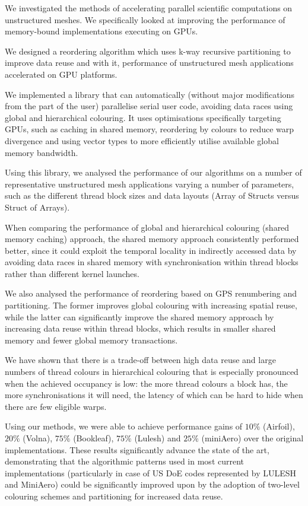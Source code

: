 We investigated the methods of accelerating parallel scientific computations on
unstructured meshes. We specifically looked at improving the performance of
memory-bound implementations executing on GPUs.

We designed a reordering algorithm which uses k-way recursive partitioning to
improve data reuse and with it, performance of unstructured mesh applications
accelerated on GPU platforms.

We implemented a library that can automatically (without major modifications
from the part of the user) parallelise serial user code, avoiding data races
using global and hierarchical colouring. It uses optimisations specifically
targeting GPUs, such as caching in shared memory, reordering by colours to
reduce warp divergence and using vector types to more efficiently utilise
available global memory bandwidth.

Using this library, we analysed the performance of our algorithms on a number of
representative unstructured mesh applications varying a number of parameters,
such as the different thread block sizes and data layouts (Array of Structs
versus Struct of Arrays).

When comparing the performance of global and hierarchical colouring (shared
memory caching) approach, the shared memory approach consistently performed
better, since it could exploit the temporal locality in indirectly accessed data
by avoiding data races in shared memory with synchronisation within thread
blocks rather than different kernel launches.

We also analysed the performance of reordering based on GPS renumbering and
partitioning. The former improves global colouring with increasing spatial
reuse, while the latter can significantly improve the shared memory approach by
increasing data reuse within thread blocks, which results in smaller shared
memory and fewer global memory transactions.

We have shown that there is a trade-off between high data reuse and large
numbers of thread colours in hierarchical colouring that is especially
pronounced when the achieved occupancy is low: the more thread colours a block
has, the more synchronisations it will need, the latency of which can be hard to
hide when there are few eligible warps.

Using our methods, we were able to achieve performance gains of $10\%$
(Airfoil), $20\%$ (Volna), $75\%$ (Bookleaf), $75\%$ (Lulesh) and $25\%$
(miniAero) over the original implementations. These results significantly
advance the state of the art, demonstrating that the algorithmic patterns used
in most current implementations (particularly in case of US DoE codes
represented by LULESH and MiniAero) could be significantly improved upon by the
adoption of two-level colouring schemes and partitioning for increased data
reuse.

